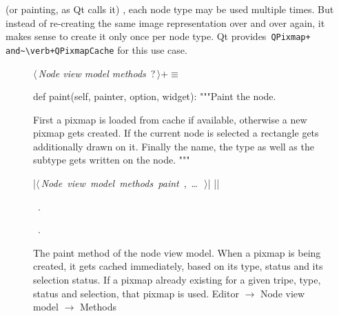 \documentclass[%
    a4paper,    %
    justified,  %
    nobib,      %
    openany     %
]{tufte-book}
\makeatletter
\renewcommand{\label}[1]{\@tufte@label{##1}}%
\makeatother
\begin{document}
 (or painting, as Qt calls it) ,
each node type may be used multiple times. But instead of re-creating the same
image representation over and over again, it makes sense to create it only once
per node type. Qt provides~\verb=QPixmap+ and~\verb+QPixmapCache= for this use
case.

\begin{figure}
\begin{flushleft} \small
\begin{minipage}{\linewidth}\label{scrap73}\raggedright\small
{} $\langle\,${\itshape Node view model methods}\nobreak\ {\footnotesize {?}}$\,\rangle+\equiv$
\vspace{-1ex}
\begin{pythoncode}
def paint(self, painter, option, widget):
    """Paint the node.

    First a pixmap is loaded from cache if available, otherwise
    a new pixmap gets created. If the current node is selected a
    rectangle gets additionally drawn on it. Finally the name, the type
    as well as the subtype gets written on the node.
    """

    |\hbox{$\langle\,${\itshape Node view model methods paint}\nobreak\ {\footnotesize {}, \ldots\ }$\,\rangle$}|
|\NWsep|
\end{pythoncode}
\vspace{1.5ex}
\footnotesize
\begin{list}{}{\setlength{\itemsep}{-\parsep}\setlength{\itemindent}{-\leftmargin}}
\item \NWtxtMacroDefBy\ .
\item \NWtxtMacroRefIn\ .

\item{}
\end{list}
\end{minipage}\vspace{4ex}
\end{flushleft}
\caption{The paint method of the node view model. When a pixmap is being
  created, it gets cached immediately, based on its type, status and its
  selection status. If a pixmap already existing for a given tripe, type, status
  and selection, that pixmap is used.
  \newline{}\newline{}Editor $\rightarrow$ Node view model $\rightarrow$
  Methods}
\label{editor:lst:node-view-model:methods:paint}
\end{figure}
\end{document}
